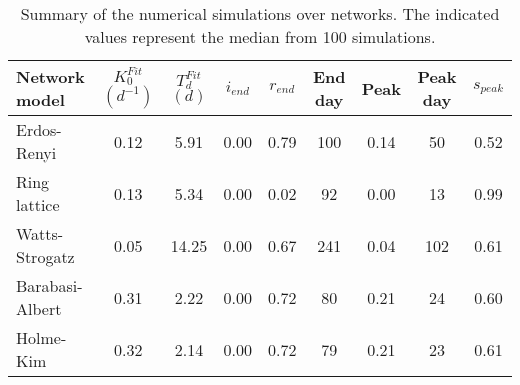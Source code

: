 \begin{table}[h!]
\centering
\caption{Summary of the numerical simulations over networks. The indicated values represent the median from 100 simulations.}
\label{tab:results}
\begin{tabular}{lcccccccc}
\toprule
   Network model & $K_0^{Fit}$ $(d^{-1})$ & $T_d^{Fit}$ $(d)$ & $i_{end}$ & $r_{end}$ & End day & Peak  & Peak day & $s_{peak}$\\
\midrule
 Erdos-Renyi 			&    0.12 &   5.91 &  0.00 &  0.79 &    100 &  0.14 &   50 & 0.52 \\
 Ring lattice 		&    0.13 &   5.34 &  0.00 &  0.02 &  	 92 &  0.00 &   13 & 0.99 \\
 Watts-Strogatz 	&    0.05 &  14.25 &  0.00 &  0.67 &    241 &  0.04 &  102 & 0.61 \\
 Barabasi-Albert 	&    0.31 &   2.22 &  0.00 &  0.72 &  	 80 &  0.21 &   24 & 0.60 \\
 Holme-Kim 				&    0.32 &   2.14 &  0.00 &  0.72 &  	 79 &  0.21 &   23 & 0.61 \\

 
\bottomrule
\end{tabular}
\end{table}
